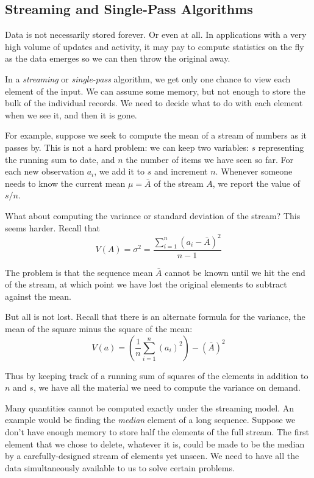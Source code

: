 \documentclass[10pt]{article}
\begin{document}
\begin{enumerate}
\subsection{Streaming and Single-Pass Algorithms}
Data is not necessarily stored forever. Or even at all. In applications with a very high volume of updates and activity, it may pay to compute statistics on the fly as the data emerges so we can then throw the original away.

In a \textit{streaming} or \textit{single-pass} algorithm, we get only one chance to view each element of the input. We can assume some memory, but not enough to store the bulk of the individual records. We need to decide what to do with each element when we see it, and then it is gone.

For example, suppose we seek to compute the mean of a stream of numbers as it passes by. This is not a hard problem: we can keep two variables: $s$ representing the running sum to date, and $n$ the number of items we have seen so far. For each new observation $a_{i}$, we add it to $s$ and increment $n$. Whenever someone needs to know the current mean $\mu=\bar{A}$ of the stream $A$, we report the value of $s / n$.

What about computing the variance or standard deviation of the stream? This seems harder. Recall that
\[ V(A)=\sigma^{2}=\frac{\sum_{i=1}^{n}\left(a_{i}-\bar{A}\right)^{2}}{n-1} \]

The problem is that the sequence mean $\bar{A}$ cannot be known until we hit the end of the stream, at which point we have lost the original elements to subtract against the mean.

But all is not lost. Recall that there is an alternate formula for the variance, the mean of the square minus the square of the mean:
\[ V(a)=\left(\frac{1}{n} \sum_{i=1}^{n}\left(a_{i}\right)^{2}\right)-(\bar{A})^{2} \]

Thus by keeping track of a running sum of squares of the elements in addition to $n$ and $s$, we have all the material we need to compute the variance on demand.

Many quantities cannot be computed exactly under the streaming model. An example would be finding the \textit{median} element of a long sequence. Suppose we don't have enough memory to store half the elements of the full stream. The first element that we chose to delete, whatever it is, could be made to be the median by a carefully-designed stream of elements yet unseen. We need to have all the data simultaneously available to us to solve certain problems.


\end{enumerate}
\end{document}
